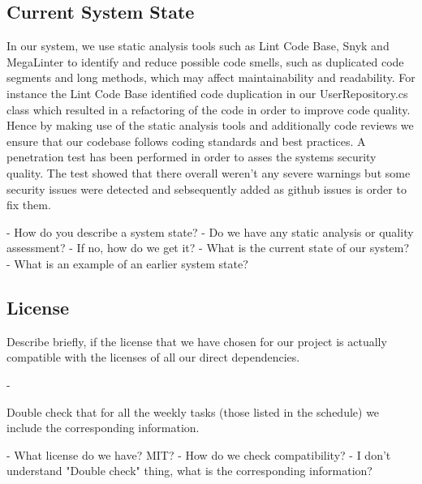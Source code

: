 
\subsection{Current System State}

In our system, we use static analysis tools such as Lint Code Base, Snyk and MegaLinter to identify and reduce possible code smells, such as duplicated code segments and long methods, which may affect maintainability and readability. 
For instance the Lint Code Base identified code duplication in our UserRepository.cs class which resulted in a refactoring of the code in order to improve code quality. Hence by making use of the static analysis tools and additionally code reviews we ensure that our codebase follows coding standards and best practices.
A penetration test has been performed in order to asses the systems security quality. The test showed that there overall weren't any severe warnings but some security issues were detected and sebsequently added as github issues is order to fix them. 




- How do you describe a system state?
- Do we have any static analysis or quality assessment?
- If no, how do we get it?
- What is the current state of our system?
- What is an example of an earlier system state?

\subsection{License}
Describe briefly, if the license that we have chosen for our project is actually compatible with the licenses of all our direct dependencies. 

-

Double check that for all the weekly tasks (those listed in the schedule) we include the corresponding information.

- What license do we have? MIT?
- How do we check compatibility?
- I don't understand "Double check" thing, what is the corresponding information?
